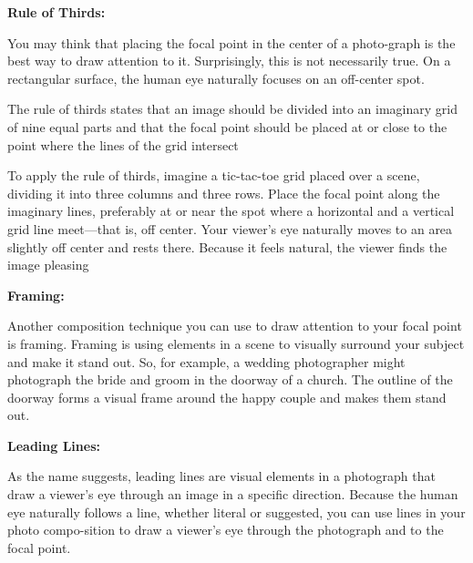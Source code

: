 \documentclass{report}
\begin{document}
    \bigbreak \noindent \bigbreak \noindent 
    \begin{Large}
        \textbf{Rule of Thirds:}
    \end{Large}
    
    \bigbreak \noindent 
    You may think that placing the focal point in the center of a photo-graph is the best way to draw attention to it. Surprisingly, this is not necessarily true. On a rectangular surface, the human eye naturally focuses on an off-center spot.

    \bigbreak \noindent 
    The rule of thirds states that an image should be divided into an imaginary grid of nine equal parts and that the focal point should be placed at or close to the point where the lines of the grid intersect

    \bigbreak \noindent 
    To apply the rule of thirds, imagine a tic-tac-toe grid placed over a scene, dividing it into three columns and three rows. Place the focal point along the imaginary lines, preferably at or near the spot where a horizontal and a vertical grid line meet—that is, off center. Your viewer’s eye naturally moves to an area slightly off center and rests there. Because it feels natural, the viewer finds the image pleasing

    \bigbreak \noindent \bigbreak \noindent
    \begin{Large}
        \textbf{Framing:}
    \end{Large}

    \bigbreak \noindent 
    Another composition technique you can use to draw attention to your focal point is framing. Framing is using elements in a scene to visually surround your subject and make it stand out. So, for example, a wedding photographer might photograph the bride and groom in the doorway of a church. The outline of the doorway forms a visual frame around the happy couple and makes them stand out.

    \bigbreak \noindent 

    \bigbreak \noindent \bigbreak \noindent 
    \begin{Large}
        \textbf{Leading Lines:}
    \end{Large}

    \bigbreak \noindent 
    As the name suggests, leading lines are visual elements in a photograph that draw a viewer’s eye through an image in a specific direction. Because the human eye naturally follows a line, whether literal or suggested, you can use lines in your photo compo-sition to draw a viewer’s eye through the photograph and to the focal point.
\end{document}
